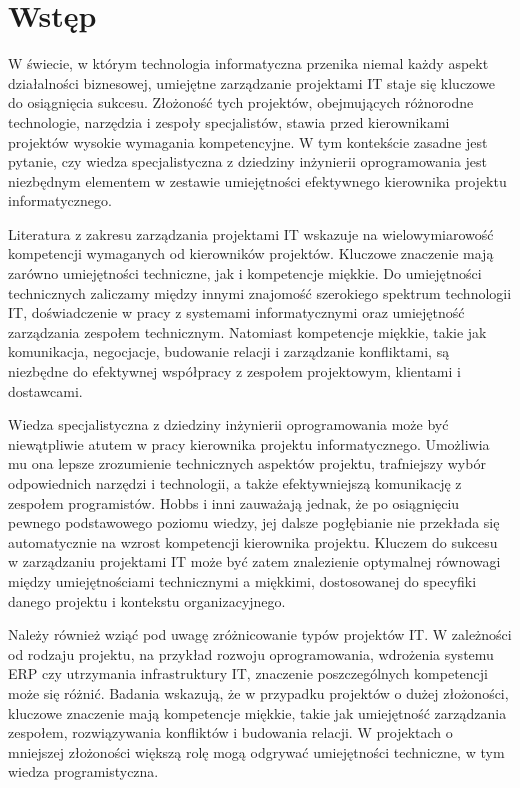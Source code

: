 \newpage %
\section{Wstęp}
W świecie, w którym technologia informatyczna przenika niemal każdy aspekt działalności biznesowej, umiejętne zarządzanie projektami IT staje się kluczowe do osiągnięcia sukcesu. Złożoność tych projektów, obejmujących różnorodne technologie, narzędzia i zespoły specjalistów, stawia przed kierownikami projektów wysokie wymagania kompetencyjne. W tym kontekście zasadne jest pytanie, czy wiedza specjalistyczna z dziedziny inżynierii oprogramowania jest niezbędnym elementem w zestawie umiejętności efektywnego kierownika projektu informatycznego. 

Literatura z zakresu zarządzania projektami IT wskazuje na wielowymiarowość kompetencji wymaganych od kierowników projektów. Kluczowe znaczenie mają zarówno umiejętności techniczne, jak i kompetencje miękkie. Do umiejętności technicznych zaliczamy między innymi znajomość szerokiego spektrum technologii IT, doświadczenie w pracy z systemami informatycznymi oraz umiejętność zarządzania zespołem technicznym. \autocite{haggerty}\autocite{langer} Natomiast kompetencje miękkie, takie jak komunikacja, negocjacje, budowanie relacji i zarządzanie konfliktami, są niezbędne do efektywnej współpracy z zespołem projektowym, klientami i dostawcami.

Wiedza specjalistyczna z dziedziny inżynierii oprogramowania może być niewątpliwie atutem w pracy kierownika projektu informatycznego. Umożliwia mu ona lepsze zrozumienie technicznych aspektów projektu, trafniejszy wybór odpowiednich narzędzi i technologii, a także efektywniejszą komunikację z zespołem programistów. Hobbs i inni zauważają jednak, że po osiągnięciu pewnego podstawowego poziomu wiedzy, jej dalsze pogłębianie nie przekłada się automatycznie na wzrost kompetencji kierownika projektu. \autocite{hobbs} Kluczem do sukcesu w zarządzaniu projektami IT może być zatem znalezienie optymalnej równowagi między umiejętnościami technicznymi a miękkimi, dostosowanej do specyfiki danego projektu i kontekstu organizacyjnego.

Należy również wziąć pod uwagę zróżnicowanie typów projektów IT.  W zależności od rodzaju projektu, na przykład rozwoju oprogramowania, wdrożenia systemu ERP czy utrzymania infrastruktury IT, znaczenie poszczególnych kompetencji może się różnić. Badania wskazują, że w przypadku projektów o dużej złożoności, kluczowe znaczenie mają kompetencje miękkie, takie jak umiejętność zarządzania zespołem, rozwiązywania konfliktów i budowania relacji. W projektach o mniejszej złożoności większą rolę mogą odgrywać umiejętności techniczne, w tym wiedza programistyczna. \autocite{podgorska}\autocite{jiang}

